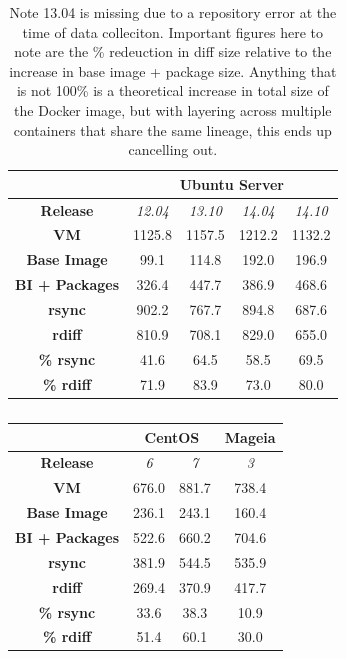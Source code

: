 \begin{table}[h]
\centering
    \begin{tabular}{| c | c | c | c | c |}
    \hline
& \multicolumn{4}{|c|}{\bfseries Ubuntu Server} \\ \hline
    \bfseries Release & \itshape 12.04 & \itshape 13.10 & \itshape 14.04 & \itshape 14.10 \\ \hline
    \bfseries VM & 1125.8 & 1157.5 & 1212.2 & 1132.2\\ \hline
    \bfseries Base Image & 99.1 & 114.8 & 192.0 & 196.9  \\ \hline
    \bfseries BI + Packages & 326.4 & 447.7 & 386.9 & 468.6  \\ \hline
    \bfseries rsync & 902.2 & 767.7 & 894.8 & 687.6\\ \hline 
    \bfseries rdiff & 810.9 & 708.1 & 829.0 & 655.0\\ \hline \hline
     \bfseries \% rsync & 41.6 & 64.5 & 58.5 & 69.5\\ \hline
 \bfseries \% rdiff & 71.9 & 83.9 & 73.0 & 80.0\\
    \hline
    \end{tabular}
\caption{Note 13.04 is missing due to a repository error at the time of data colleciton. Important figures here to note are the \% redeuction in diff size relative to the increase in base image + package size. Anything that is not 100\% is a theoretical increase in total size of the Docker image, but with layering across multiple containers that share the same lineage, this ends up cancelling out.}
\label{table:diff}
\end{table}

\begin{table}[h]
\centering
    \begin{tabular}{| c | c | c | c |}
    \hline
& \multicolumn{2}{|c|}{\bfseries CentOS} & \multicolumn{1}{|c|}{\bfseries Mageia} \\ \hline
    \bfseries Release & \itshape 6 & \itshape 7 & \itshape 3 \\ \hline
    \bfseries VM & 676.0 & 881.7 & 738.4\\ \hline
    \bfseries Base Image & 236.1 & 243.1 & 160.4  \\ \hline
    \bfseries BI + Packages & 522.6 & 660.2 & 704.6 \\ \hline
    \bfseries rsync & 381.9 & 544.5 & 535.9 \\ \hline 
    \bfseries rdiff & 269.4 & 370.9 & 417.7 \\ \hline \hline
     \bfseries \% rsync & 33.6 & 38.3 & 10.9 \\ \hline
 \bfseries \% rdiff & 51.4 & 60.1 & 30.0 \\
    \hline
    \end{tabular}
\caption{}
\label{table:diff}
\end{table}




